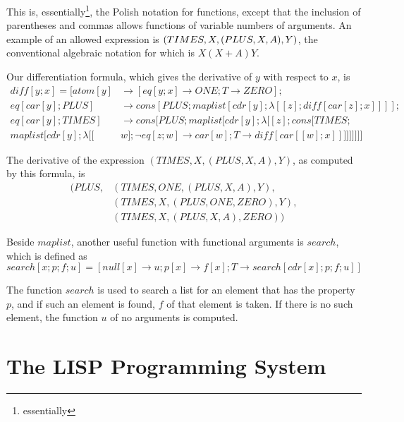 \documentclass[11pt, a4paper]{article}
\begin{document}
This is,
essentially\footnote{essentially},
the Polish notation for functions, except that the
inclusion of parentheses and commas allows functions of variable numbers of
arguments. An example of an allowed expression is $(TIMES, X, (PLUS, X,\\
A), Y)$, the conventional algebraic notation for which is $X(X + A)Y$.

Our differentiation formula, which gives the derivative of $y$ with respect to
$x$, is
\begin{align*}
  diff[y; x] = [atom[y] &\to [eq[y; x] \to ONE; T \to ZERO];                  \\
    eq[car[y]; PLUS] &\to cons[PLUS; maplist[cdr[y]; \lambda[[z]; diff[car[z];
            x]]]];                                                            \\
    eq[car[y]; TIMES] &\to cons[PLUS; maplist[cdr[y]; \lambda[[z]; cons[TIMES;\\
maplist[cdr[y]; \lambda[[&w]; \lnot eq[z; w] \to car[w]; T \to diff[car[[w];
        x]]]]]]]]]
\end{align*}

The derivative of the expression $(TIMES, X, (PLUS, X, A), Y)$, as computed by
this formula, is
\begin{align*}
(PLUS, &(TIMES, ONE, (PLUS, X, A), Y),    \\
       &(TIMES, X, (PLUS, ONE, ZERO), Y), \\
       &(TIMES, X, (PLUS, X, A), ZERO))
\end{align*}

Beside $maplist$, another useful function with functional arguments is $search$,
which is defined as
$$ search[x; p; f; u] = [null[x] \to u; p[x] \to f[x]; T \to search[cdr[x]; p;
    f; u]] $$

The function $search$ is used to search a list for an element that has the
property $p$, and if such an element is found, $f$ of that element is taken. If
there is no such element, the function $u$ of no arguments is computed.

\section{The LISP Programming System}
\end{document}
